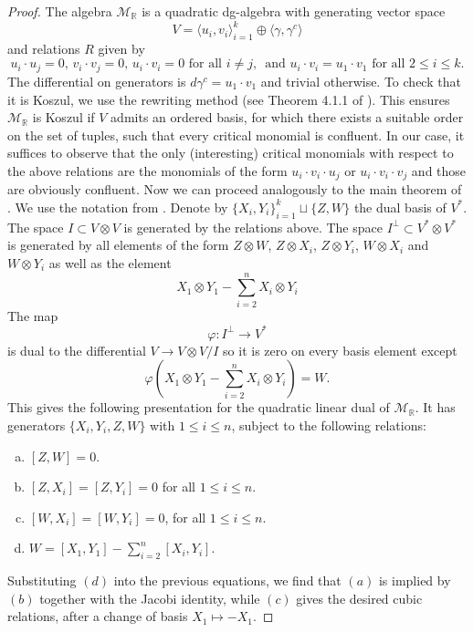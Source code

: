 \documentclass[a4paper]{amsart}
\theoremstyle{definition}
\newcommand{\RR}{\mathbb{R}}
\newcommand{\Mm}{\mathcal{M}}
\begin{document}
\begin{proof}
The algebra $\Mm_\RR$ is a quadratic dg-algebra with generating vector space \[V=\langle u_i,v_i\rangle_{i=1}^k\oplus \langle\gamma,\gamma^c\rangle\] and relations $R$ given by
\[u_i\cdot u_j=0,\, v_i\cdot v_j=0,\, u_i\cdot v_i=0\text{ for all } i\neq j,\, \text{ and }u_i\cdot v_i=u_1\cdot v_1\text{ for all } 2\leq i\leq k.\]
The differential on generators is $d\gamma^c=u_1\cdot v_1$ and trivial otherwise.
To check that it is Koszul, we use the rewriting method (see Theorem 4.1.1 of \cite{LoVa}).
This ensures $\Mm_\RR$ is Koszul if
 $V$ admits an ordered basis, for which there exists a suitable
order on the set of tuples, such that every critical monomial is confluent.
In our case, it suffices to observe that the only (interesting) critical monomials with respect to the above relations are the monomials of the form $u_i\cdot {v_i}\cdot u_j$ or $u_i\cdot v_i\cdot v_j$ and those are obviously confluent.
Now we can proceed
analogously to the main theorem of \cite{Bez}. We use the notation from \cite[Section 3]{Bez}.
Denote by $\{X_i,Y_i\}_{i=1}^k\sqcup\{Z,W\}$ the dual basis of $V^*$. The space $I\subset V\otimes V$ is generated by the relations above. The space $I^{\perp}\subset V^*\otimes V^*$  is generated by all elements of the form $Z\otimes W$, $Z\otimes X_i$, $Z\otimes Y_i$, $W\otimes X_i$ and $W\otimes Y_i$ as well as the element
\[X_1\otimes Y_1-\sum_{i=2}^n X_i\otimes Y_i\]
The map
\[\varphi:I^{\perp}\to V^*\]
is dual to the differential $V\to V\otimes V/I$ so it is zero on every basis element except
\[\varphi(X_1\otimes Y_1-\sum_{i=2}^n X_i\otimes Y_i)=W.\]
This gives the following presentation for the quadratic linear dual of $\Mm_\RR$. It has generators
$\{X_i,Y_i,Z,W\}$ with $1\leq i\leq n$, subject to the following relations:
\begin{enumerate}[(a)]
\item $[Z,W]=0$.
\item $[Z,X_i]=[Z,Y_i]=0$ for all $1\leq i\leq n$.
\item $[W,X_i]=[W,Y_i]=0$, for all $1\leq i\leq n$.
\item $W=[X_1,Y_1]-\sum_{i=2}^n [X_i,Y_i]$.
\end{enumerate}
Substituting $(d)$ into the previous equations, we find that $(a)$ is implied by $(b)$ together with the Jacobi identity,
while $(c)$ gives the desired cubic relations, after a change of basis $X_1\mapsto -X_1$.
\end{proof}




\end{document}
